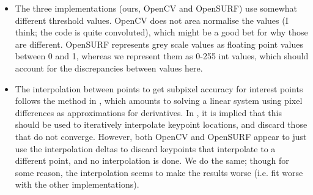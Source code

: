 \begin{itemize}
\item The three implementations (ours, OpenCV and OpenSURF) use
  somewhat different threshold values. OpenCV does not area normalise
  the values (I think; the code is quite convoluted), which might be a
  good bet for why those are different. OpenSURF represents grey scale
  values as floating point values between 0 and 1, whereas we
  represent them as 0-255 int values, which should account for the
  discrepancies between values here.
\item The interpolation between points to get subpixel accuracy for
  interest points follows the method in \cite{inv-features}, which
  amounts to solving a linear system using pixel differences as
  approximations for derivatives. In \cite{SURF}, it is implied that
  this should be used to iteratively interpolate keypoint locations,
  and discard those that do not converge. However, both OpenCV and
  OpenSURF appear to just use the interpolation deltas to discard
  keypoints that interpolate to a different point, and no
  interpolation is done. We do the same; though for some reason, the
  interpolation seems to make the results worse (i.e. fit worse with
  the other implementations).
\end{itemize}
